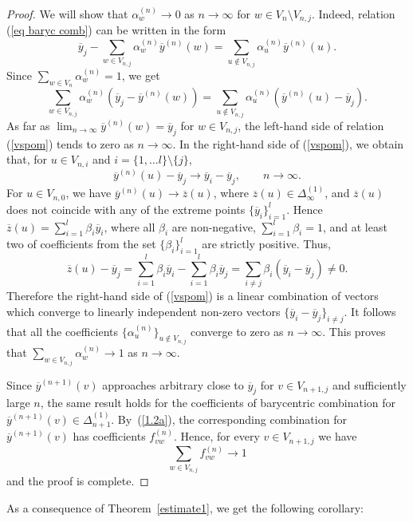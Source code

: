 \documentclass[11pt, english, reqno]{amsart}
\theoremstyle{definition}
\theoremstyle{remark}
\theoremstyle{plain}
\def\ov{\overline}
\numberwithin{equation}{section}
\begin{document}
{\begin{proof}
We will show that $\alpha_w^{(n)} \rightarrow 0$ as
$n \rightarrow \infty$ for $w \in V_n \setminus V_{n,j}$.
Indeed, relation (\ref{eq baryc comb}) can be written in the form
$$
\ov y_j - \sum_{w \in V_{n,j}}\alpha_w^{(n)} \ov y^{(n)}(w) = \sum_{u
\notin V_{n,j}}\alpha_u^{(n)} \ov y^{(n)}(u).
$$
Since $\sum_{w \in V_n} \alpha_w^{(n)} = 1$, we get
\begin{equation}\label{vspom}
\sum_{w \in V_{n,j}}\alpha_w^{(n)} (\ov y_j - \ov y^{(n)}(w)) =
\sum_{u \notin V_{n,j}}\alpha_u^{(n)} (\ov y^{(n)}(u) - \ov
y_j).
\end{equation}
As far as $\lim_{n \rightarrow \infty}\ov y^{(n)}(w) = \ov y_j$ for $w \in
V_{n,j}$, the left-hand side of relation (\ref{vspom}) tends to zero as $n\to
\infty$. In the right-hand side of  (\ref{vspom}), we obtain that,
for $u \in V_{n,i}$ and $i = \{1,\ldots l\} \setminus \{j\}$,
 $$
 \ov y^{(n)}(u)-  \ov y_j \rightarrow \ov y_i - \ov y_j, \qquad
 n \rightarrow \infty.
 $$
For $u \in V_{n,0}$, we have $\ov y^{(n)}(u) \rightarrow \ov z(u)$, where
$\ov z(u) \in  \Delta_\infty^{(1)}$, and $\ov z(u)$ does not coincide with
 any of the extreme points $\{\ov y_i\}_{i = 1}^l$. Hence $\ov z(u) =
 \sum_{i = 1}^l
\beta_i \ov y_i$, where all $\beta_i$ are non-negative, $\sum_{i=1}^l
 \beta_i = 1$, and at least two of coefficients from the set
  $\{\beta_i\}_{i = 1}^l$ are strictly positive. Thus,
$$
\ov z(u) - \ov y_j = \sum_{i = 1}^l \beta_i \ov y_i - \sum_{i = 1}^l
\beta_i \ov y_j = \sum_{i \neq j} \beta_i (\ov y_i - \ov y_j) \neq 0.
$$
Therefore the right-hand side of (\ref{vspom}) is a linear combination of
vectors which converge to linearly independent non-zero vectors
$\{\ov y_i - \ov y_j\}_{i \neq j}$. It follows that all the coefficients
$\{\alpha_u^{(n)}\}_{u \notin V_{n,j}}$ converge to zero as $n \to \infty$.
This proves that
$\sum_{w \in  V_{n,j}} \alpha_w^{(n)} \rightarrow 1$ as $n \to \infty$.

Since $\ov y^{(n+1)}(v)$
 approaches arbitrary close to $\ov y_j$ for $v\in
 V_{n+1,j}$ and  sufficiently  large $n$, the same result holds for
 the coefficients of barycentric  combination for
 $\ov y^{(n+1)}(v)\in \Delta_{n+1}^{(1)}$.  By~(\ref{1.2a}), the
   corresponding combination for $\ov
 y^{(n+1)}(v)$ has coefficients $f_{vw}^{(n)}$. Hence, for every
 $v \in V_{n +1,j}$ we have
$$
\sum_{w \in V_{n,j}} f_{vw}^{(n)} \rightarrow 1
$$
and the proof is complete.
\end{proof}


As a consequence of Theorem~\ref{estimate1}, we get the following corollary:


}
\end{document}
